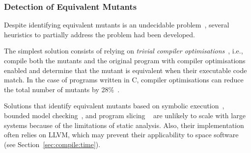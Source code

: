 \subsubsection{Detection of Equivalent Mutants}

Despite identifying equivalent mutants is an undecidable problem~\cite{madeyski2013overcoming}, several heuristics to partially address the problem had been developed. 

The simplest solution consists of relying on \emph{trivial compiler optimisations}~\cite{papadakis2015trivial, kintis2017detecting,papadakis2019mutation}, i.e., compile both the mutants and the original program with compiler optimisations enabled and determine that the mutant is equivalent when their executable code match. In the case of programs written in C, compiler optimisations can reduce the total number of mutants by 28\%~\cite{kintis2017detecting}.


Solutions that identify equivalent mutants based on symbolic execution~\cite{holling2016nequivack}, bounded model checking~\cite{riener2011test}, and program slicing ~\cite{harman2001relationship} are unlikely to scale with large systems because of the limitations of static analysis. Also, their implementation often relies on LLVM, which may prevent their applicability to space software (see Section~\ref{sec:compile:time}).

